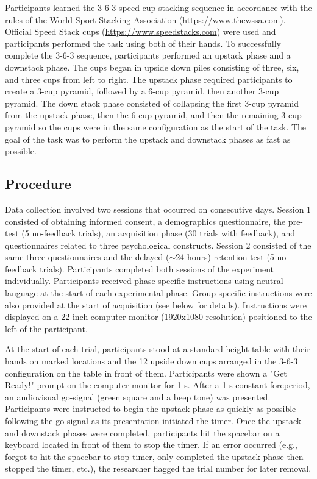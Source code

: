\documentclass[man,floatsintext,donotrepeattitle,letterpaper,12pt]{apa7}
\begin{document}
Participants learned the 3-6-3 speed cup stacking sequence in accordance with the rules of the World Sport Stacking Association (\url{https://www.thewssa.com}). Official Speed Stack cups (\url{https://www.speedstacks.com}) were used and participants performed the task using both of their hands. To successfully complete the 3-6-3 sequence, participants performed an upstack phase and a downstack phase. The cups began in upside down piles consisting of three, six, and three cups from left to right. The upstack phase required participants to create a 3-cup pyramid, followed by a 6-cup pyramid, then another 3-cup pyramid. The down stack phase consisted of collapsing the first 3-cup pyramid from the upstack phase, then the 6-cup pyramid, and then the remaining 3-cup pyramid so the cups were in the same configuration as the start of the task. The goal of the task was to perform the upstack and downstack phases as fast as possible.

\subsection{Procedure}

Data collection involved two sessions that occurred on consecutive days. Session 1 consisted of obtaining informed consent, a demographics questionnaire, the pre-test (5 no-feedback trials), an acquisition phase (30 trials with feedback), and questionnaires related to three psychological constructs. Session 2 consisted of the same three questionnaires and the delayed ($\sim$24 hours) retention test (5 no-feedback trials). Participants completed both sessions of the experiment individually. Participants received phase-specific instructions using neutral language at the start of each experimental phase. Group-specific instructions were also provided at the start of acquisition (see below for details). Instructions were displayed on a 22-inch computer monitor (1920x1080 resolution) positioned to the left of the participant.

At the start of each trial, participants stood at a standard height table with their hands on marked locations and the 12 upside down cups arranged in the 3-6-3 configuration on the table in front of them. Participants were shown a "Get Ready!" prompt on the computer monitor for 1 s. After a 1 s constant foreperiod, an audiovisual go-signal (green square and a beep tone) was presented. Participants were instructed to begin the upstack phase as quickly as possible following the go-signal as its presentation initiated the timer. Once the upstack and downstack phases were completed, participants hit the spacebar on a keyboard located in front of them to stop the timer. If an error occurred (e.g., forgot to hit the spacebar to stop timer, only completed the upstack phase then stopped the timer, etc.), the researcher flagged the trial number for later removal.
\end{document}
